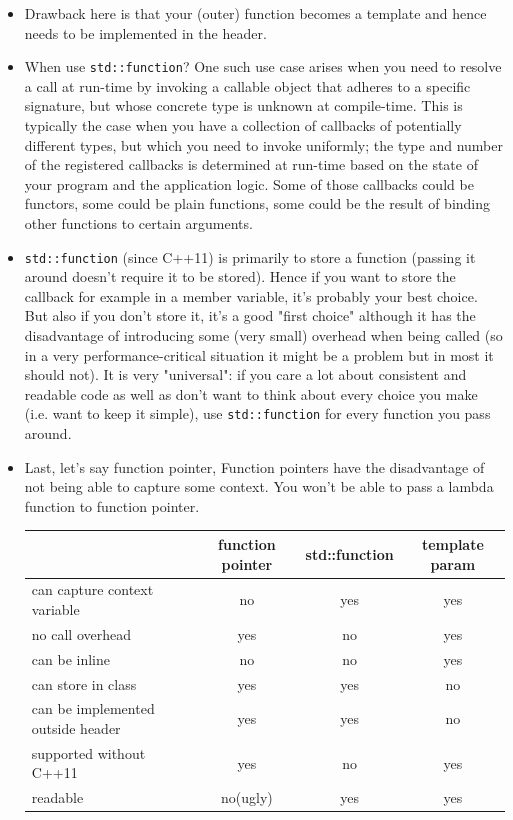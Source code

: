 \documentclass[a4paper,11pt,twoside]{book}
\begin{document}
\begin{itemize}
	\item Drawback here is that your (outer) function becomes a template and hence needs to be implemented in the header.
	
	\item When use \texttt{std::function}? One such use case arises when you need to resolve a call at run-time by invoking a callable object that adheres to a specific signature, but whose concrete type is unknown at compile-time. This is typically the case when you have a collection of callbacks of potentially different types, but which you need to invoke uniformly; the type and number of the registered callbacks is determined at run-time based on the state of your program and the application logic. Some of those callbacks could be functors, some could be plain functions, some could be the result of binding other functions to certain arguments.
	
	\item \texttt{std::function} (since C++11) is primarily to store a function (passing it around doesn't require it to be stored). Hence if you want to store the callback for example in a member variable, it's probably your best choice. But also if you don't store it, it's a good "first choice" although it has the disadvantage of introducing some (very small) overhead when being called (so in a very performance-critical situation it might be a problem but in most it should not). It is very "universal": if you care a lot about consistent and readable code as well as don't want to think about every choice you make (i.e. want to keep it simple), use \texttt{std::function} for every function you pass around.
	
	\item Last, let's say function pointer, Function pointers have the disadvantage of not being able to capture some context. You won't be able to pass a lambda function to function pointer. 
	
	
 	\begin{tabular}{| p{}| c | c| c |}
		\hline
		 & function pointer  & std::function  & template param  \\
		\hline
		can capture context variable & no  & yes  & yes  \\
		\hline
		no call overhead & yes & no  & yes \\
		\hline
		can be inline& no &  no & yes \\
		\hline
		can store in class& yes & yes & no \\
		\hline
		can be implemented outside header& yes  & yes & no \\
		\hline
		supported without C++11& yes & no  & yes \\
		\hline
		readable & no(ugly) & yes  & yes  \\
		\hline
	\end{tabular}
	

\end{itemize}
\end{document}
